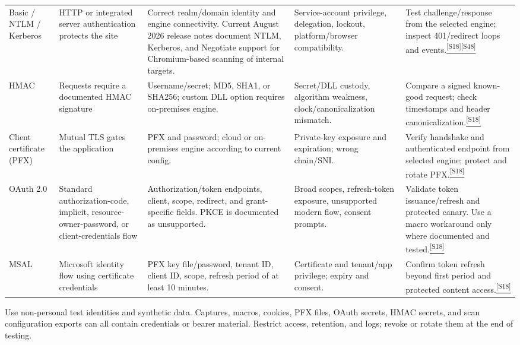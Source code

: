 \documentclass[11pt,letterpaper,oneside]{scrreprt}
\newcommand{\src}[1]{\hyperref[src:#1]{\textsuperscript{\color{R7Orange}[#1]}}}
\begin{document}
\begin{landscape}
\begin{longtable}{@{}P{1.10in}P{1.25in}P{1.95in}P{1.95in}P{2.05in}@{}}
Basic / NTLM / Kerberos & HTTP or integrated server authentication protects the site & Correct realm/domain identity and engine connectivity. Current August 2026 release notes document NTLM, Kerberos, and Negotiate support for Chromium-based scanning of internal targets. & Service-account privilege, delegation, lockout, platform/browser compatibility. & Test challenge/response from the selected engine; inspect 401/redirect loops and events.\src{S18}\src{S48}\\
HMAC & Requests require a documented HMAC signature & Username/secret; MD5, SHA1, or SHA256; custom DLL option requires on-premises engine. & Secret/DLL custody, algorithm weakness, clock/canonicalization mismatch. & Compare a signed known-good request; check timestamps and header canonicalization.\src{S18}\\
Client certificate (PFX) & Mutual TLS gates the application & PFX and password; cloud or on-premises engine according to current config. & Private-key exposure and expiration; wrong chain/SNI. & Verify handshake and authenticated endpoint from selected engine; protect and rotate PFX.\src{S18}\\
OAuth 2.0 & Standard authorization-code, implicit, resource-owner-password, or client-credentials flow & Authorization/token endpoints, client, scope, redirect, and grant-specific fields. PKCE is documented as unsupported. & Broad scopes, refresh-token exposure, unsupported modern flow, consent prompts. & Validate token issuance/refresh and protected canary. Use a macro workaround only where documented and tested.\src{S18}\\
MSAL & Microsoft identity flow using certificate credentials & PFX key file/password, tenant ID, client ID, scope, refresh period of at least 10 minutes. & Certificate and tenant/app privilege; expiry and consent. & Confirm token refresh beyond first period and protected content access.\src{S18}\\
\bottomrule
\end{longtable}
\end{landscape}

\begin{safetybox}
Use non-personal test identities and synthetic data. Captures, macros, cookies, PFX files, OAuth secrets, HMAC secrets, and scan configuration exports can all contain credentials or bearer material. Restrict access, retention, and logs; revoke or rotate them at the end of testing.
\end{safetybox}
\end{document}
